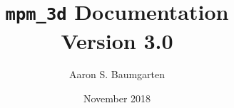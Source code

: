 \documentclass[12pt]{report}
\begin{document}
\title{\texttt{mpm\_3d} Documentation \\ \large Version 3.0}
\author{Aaron S. Baumgarten}
\date{November 2018}
\maketitle

\tableofcontents




\end{document}
